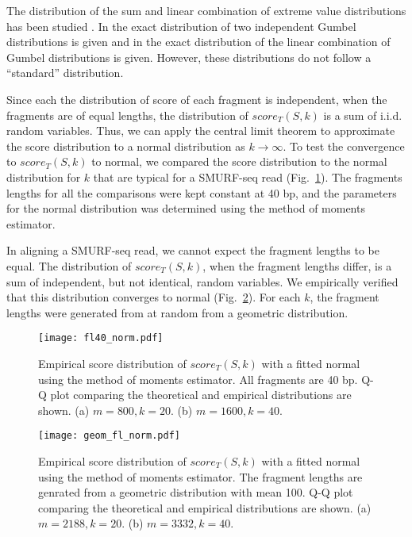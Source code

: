 The distribution of the sum and linear combination of extreme value
distributions has been studied \cite{cetinkaya2001scalable,
marques2015distribution,loaiciga1999analysis,nadarajah2008exact}.  In
\cite{loaiciga1999analysis} the exact distribution of two independent
Gumbel distributions is given and in \cite{nadarajah2008exact} the exact
distribution of the linear combination of Gumbel distributions is given.
%
However, these distributions do not follow a ``standard'' distribution.

Since each the distribution of score of each fragment is independent,
when the fragments are of equal lengths, the distribution of
$score_T(S,k)$ is a sum of i.i.d. random variables. Thus, we can apply
the central limit theorem to approximate the score distribution to a
normal distribution as $k \to \infty$. To test the convergence to
$score_T(S,k)$ to normal, we compared the score distribution to the
normal distribution for $k$ that are typical for a SMURF-seq read
(Fig.~\ref{norm_const}). The fragments lengths for all the comparisons
were kept constant at 40 bp, and the parameters for the normal
distribution was determined using the method of moments estimator.

In aligning a SMURF-seq read, we cannot expect the fragment lengths to
be equal. The distribution of $score_T(S,k)$, when the fragment lengths
differ, is a sum of independent, but not identical, random variables. We
empirically verified that this distribution converges to normal
(Fig.~\ref{norm_geom}). For each $k$, the fragment lengths were
generated from at random from a geometric distribution.

\begin{figure}[H]
\centering
\texttt{[image: fl40\_norm.pdf]}
\caption{Empirical score distribution of $score_T(S,k)$ with a fitted
  normal using the method of moments estimator. All fragments are 40 bp.
  Q-Q plot comparing the theoretical and empirical distributions are shown. 
  (a) $m=800, k=20$. 
  (b) $m=1600, k=40$.}
\label{norm_const}
\end{figure}

\begin{figure}[H]
\centering
\texttt{[image: geom\_fl\_norm.pdf]}
\caption{Empirical score distribution of $score_T(S,k)$ with a fitted
  normal using the method of moments estimator. The fragment lengths are
  genrated from a geometric distribution with mean 100. Q-Q plot comparing 
  the theoretical and empirical distributions are shown. 
  (a) $m=2188, k=20$.
  (b) $m=3332, k=40$.}
\label{norm_geom}
\end{figure}

